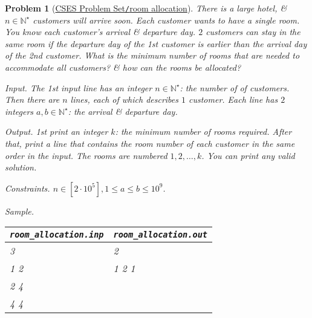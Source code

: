 \documentclass{article}
\newtheorem{problem}{Problem}
\begin{document}
\begin{problem}[\href{https://cses.fi/problemset/task/1164}{CSES Problem Set{\tt/}room allocation}]
    There is a large hotel, \& $n\in\mathbb{N}^\star$ customers will arrive soon. Each customer wants to have a single room. You know each customer's arrival \& departure day. $2$ customers can stay in the same room if the departure day of the 1st customer is earlier than the arrival day of the 2nd customer. What is the minimum number of rooms that are needed to accommodate all customers? \& how can the rooms be allocated?
    \item {\sf Input.} The 1st input line has an integer $n\in\mathbb{N}^\star$: the number of of customers. Then there are $n$ lines, each of which describes $1$ customer. Each line has $2$ integers $a,b\in\mathbb{N}^\star$: the arrival \& departure day.
    \item {\sf Output.} 1st print an integer $k$: the minimum number of rooms required. After that, print a line that contains the room number of each customer in the same order in the input. The rooms are numbered $1,2,\ldots,k$. You can print any valid solution.
    \item {\sf Constraints.} $n\in[2\cdot10^5],1\le a\le b\le10^9$.
    \item {\sf Sample.}
    \begin{table}[H]
        \centering
        \begin{tabular}{|l|l|}
            \hline
            \verb|room_allocation.inp| & \verb|room_allocation.out| \\
            \hline
            3 & 2 \\
            1 2 & 1 2 1 \\
            2 4 & \\
            4 4 & \\
            \hline
        \end{tabular}
    \end{table}
\end{problem}
\end{document}

